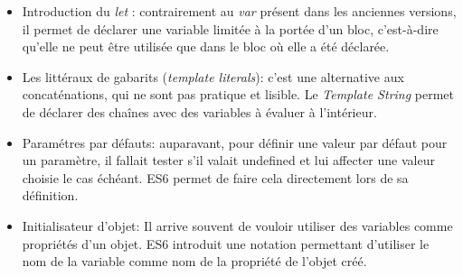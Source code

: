 \begin{itemize}
\item
  Introduction du \emph{let} : contrairement au \emph{var} présent dans
  les anciennes versions, il permet de déclarer une variable limitée à
  la portée d'un bloc, c'est-à-dire qu'elle ne peut être utilisée que
  dans le bloc où elle a été déclarée.
\item
  Les littéraux de gabarits (\emph{template literals}): c'est une
  alternative aux concaténations, qui ne sont pas pratique et lisible.
  Le \emph{Template String} permet de déclarer des chaînes avec des
  variables à évaluer à l'intérieur.

\begin{Shaded}
\begin{Highlighting}[]
 \OperatorTok{=} 
 \OperatorTok{=} \SpecialCharTok{$\{}\SpecialCharTok{\}}
 \OperatorTok{=} \OperatorTok{;}
 \OperatorTok{=}  \OperatorTok{+} \OperatorTok{;}
\end{Highlighting}
\end{Shaded}
\item
  Paramétres par défauts: auparavant, pour définir une valeur par défaut
  pour un paramètre, il fallait tester s'il valait undefined et lui
  affecter une valeur choisie le cas échéant. ES6 permet de faire cela
  directement lors de sa définition.

\begin{Shaded}
\begin{Highlighting}[]
  \OperatorTok{=} \OperatorTok{,} \OperatorTok{=} \NormalTok{) }\OperatorTok{\{}
     \OperatorTok{+} 
\OperatorTok{\}}
  \OperatorTok{,} \OperatorTok{,} \OperatorTok{\{}
     \OperatorTok{===} \NormalTok{)}
        \OperatorTok{=} \OperatorTok{;}
     \OperatorTok{===} \NormalTok{)}
        \OperatorTok{=} \OperatorTok{;}
     \OperatorTok{+} \OperatorTok{;}
\OperatorTok{\};}
\end{Highlighting}
\end{Shaded}
\item
  Initialisateur d'objet: Il arrive souvent de vouloir utiliser des
  variables comme propriétés d'un objet. ES6 introduit une notation
  permettant d'utiliser le nom de la variable comme nom de la propriété
  de l'objet créé.


\end{itemize}
